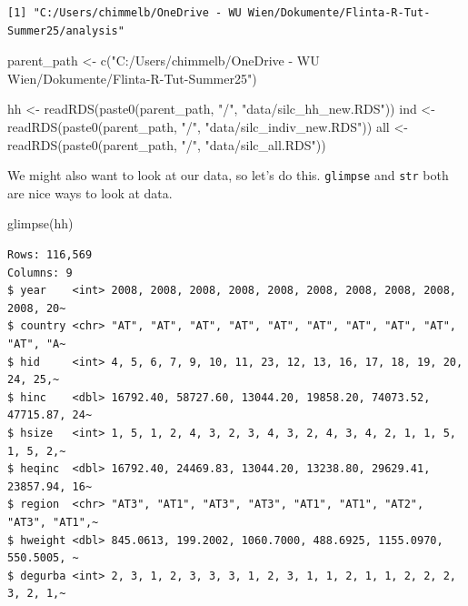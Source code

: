 \documentclass[
  letterpaper,
  DIV=11,
  numbers=noendperiod]{scrartcl}
\newenvironment{Shaded}{\begin{snugshade}}{\end{snugshade}}
\newcommand{\FunctionTok}[1]{\textcolor[rgb]{0.28,0.35,0.67}{#1}}
\newcommand{\NormalTok}[1]{\textcolor[rgb]{0.00,0.23,0.31}{#1}}
\newcommand{\OtherTok}[1]{\textcolor[rgb]{0.00,0.23,0.31}{#1}}
\newcommand{\StringTok}[1]{\textcolor[rgb]{0.13,0.47,0.30}{#1}}
\begin{document}
\begin{verbatim}
[1] "C:/Users/chimmelb/OneDrive - WU Wien/Dokumente/Flinta-R-Tut-Summer25/analysis"
\end{verbatim}

\begin{Shaded}
\begin{Highlighting}[]
\NormalTok{parent\_path }\OtherTok{\textless{}{-}} \FunctionTok{c}\NormalTok{(}\StringTok{"C:/Users/chimmelb/OneDrive {-} WU Wien/Dokumente/Flinta{-}R{-}Tut{-}Summer25"}\NormalTok{)}

\NormalTok{hh }\OtherTok{\textless{}{-}} \FunctionTok{readRDS}\NormalTok{(}\FunctionTok{paste0}\NormalTok{(parent\_path, }\StringTok{"/"}\NormalTok{, }\StringTok{"data/silc\_hh\_new.RDS"}\NormalTok{))}
\NormalTok{ind }\OtherTok{\textless{}{-}} \FunctionTok{readRDS}\NormalTok{(}\FunctionTok{paste0}\NormalTok{(parent\_path, }\StringTok{"/"}\NormalTok{, }\StringTok{"data/silc\_indiv\_new.RDS"}\NormalTok{))}
\NormalTok{all }\OtherTok{\textless{}{-}} \FunctionTok{readRDS}\NormalTok{(}\FunctionTok{paste0}\NormalTok{(parent\_path, }\StringTok{"/"}\NormalTok{, }\StringTok{"data/silc\_all.RDS"}\NormalTok{))}
\end{Highlighting}
\end{Shaded}

We might also want to look at our data, so let's do this.
\texttt{glimpse} and \texttt{str} both are nice ways to look at data.

\begin{Shaded}
\begin{Highlighting}[]
\FunctionTok{glimpse}\NormalTok{(hh)}
\end{Highlighting}
\end{Shaded}

\begin{verbatim}
Rows: 116,569
Columns: 9
$ year    <int> 2008, 2008, 2008, 2008, 2008, 2008, 2008, 2008, 2008, 2008, 20~
$ country <chr> "AT", "AT", "AT", "AT", "AT", "AT", "AT", "AT", "AT", "AT", "A~
$ hid     <int> 4, 5, 6, 7, 9, 10, 11, 23, 12, 13, 16, 17, 18, 19, 20, 24, 25,~
$ hinc    <dbl> 16792.40, 58727.60, 13044.20, 19858.20, 74073.52, 47715.87, 24~
$ hsize   <int> 1, 5, 1, 2, 4, 3, 2, 3, 4, 3, 2, 4, 3, 4, 2, 1, 1, 5, 1, 5, 2,~
$ heqinc  <dbl> 16792.40, 24469.83, 13044.20, 13238.80, 29629.41, 23857.94, 16~
$ region  <chr> "AT3", "AT1", "AT3", "AT3", "AT1", "AT1", "AT2", "AT3", "AT1",~
$ hweight <dbl> 845.0613, 199.2002, 1060.7000, 488.6925, 1155.0970, 550.5005, ~
$ degurba <int> 2, 3, 1, 2, 3, 3, 3, 1, 2, 3, 1, 1, 2, 1, 1, 2, 2, 2, 3, 2, 1,~
\end{verbatim}
\end{document}
